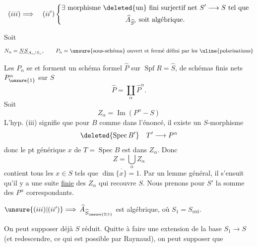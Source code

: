 
\[
(iii)\Longrightarrow\quad (ii')\left\{\begin{gathered}\exists\text{ morphisme }\deleted{\text{un}}\text{ fini surjectif net }S'\longrightarrow S\text{ tel que}\\ \widehat A_{\widehat S'}\text{ soit algébrique.}\end{gathered}\right.
\]

Soit 
\[
N_n=\underline{NS}_{A_n/S_n},\qquad P_n=\text{\unsure{sous-schéma} ouvert et fermé défini par les \uline{polarisations}}
\]

Les $P_n$ se  et forment un schéma formel $\widehat P$ sur $\operatorname{Spf}R=\widehat S$,   de schémas finis nets $P^\alpha_{\unsure{1}}$ sur $S$
\[
\widehat P=\coprod_\alpha\widehat P^\alpha.
\]
Soit
\[
Z_\alpha=\operatorname{Im}(P^\alpha\mathbin{-}S)
\]
L'hyp. (iii) signifie que pour $B$ comme dans l'énoncé, il existe un  $S$-morphisme
\[
\deleted{\operatorname{Spec}B'}\quad T'\longrightarrow P^\alpha
\]
donc le pt générique $x$ de $T=\operatorname{Spec}B$ est dans $Z_\alpha$.
Donc
\[
Z=\bigcup_\alpha Z_\alpha
\]
contient tous les $x\in S$ tels que $\dim\overline{\{x\}}=1$.
Par un lemme général, il s'ensuit qu'il y a une suite \uline{finie} des $Z_\alpha$ qui recouvre $S$. Nous prenons pour $S'$ la somme des $P^\alpha$ correspondants.

$\unsure{(iii)|(ii')}\Longrightarrow$   $\widehat A_{\widehat S_{\unsure{2|1}}}$ est algébrique, où $S_1=S_{\mathrm{réd}}$.

On peut supposer déjà $S$ réduit. Quitte à faire une extension de la base $S_1\longrightarrow S$ (et redescendre,  ce qui est possible par Raynaud), on peut supposer que

